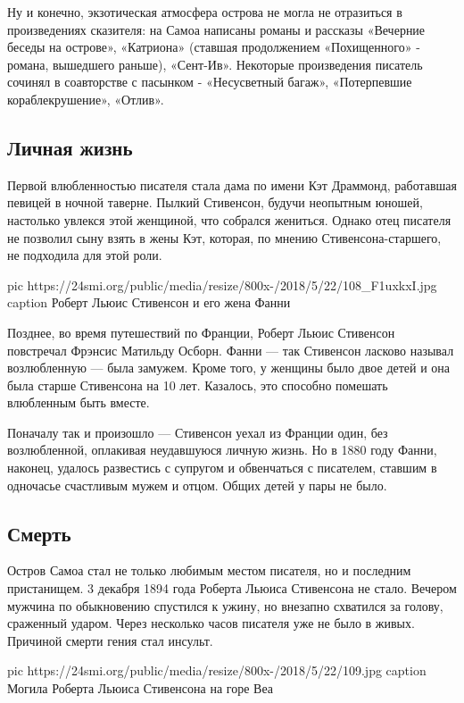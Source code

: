 Ну и конечно, экзотическая атмосфера острова не могла не отразиться в
произведениях сказителя: на Самоа написаны романы и рассказы «Вечерние
беседы на острове», «Катриона» (ставшая продолжением «Похищенного» -
романа, вышедшего раньше), «Сент-Ив». Некоторые произведения писатель
сочинял в соавторстве с пасынком - «Несусветный багаж», «Потерпевшие
кораблекрушение», «Отлив».

\subsection{Личная жизнь}

Первой влюбленностью писателя стала дама по имени Кэт Драммонд, работавшая
певицей в ночной таверне. Пылкий Стивенсон, будучи неопытным юношей,
настолько увлекся этой женщиной, что собрался жениться. Однако отец
писателя не позволил сыну взять в жены Кэт, которая, по мнению
Стивенсона-старшего, не подходила для этой роли.

\ifcmt
pic https://24smi.org/public/media/resize/800x-/2018/5/22/108_F1uxkxI.jpg
caption Роберт Льюис Стивенсон и его жена Фанни
\fi

Позднее, во время путешествий по Франции, Роберт Льюис Стивенсон
повстречал Фрэнсис Матильду Осборн. Фанни — так Стивенсон ласково называл
возлюбленную — была замужем. Кроме того, у женщины было двое детей и она
была старше Стивенсона на 10 лет. Казалось, это способно помешать
влюбленным быть вместе.

Поначалу так и произошло — Стивенсон уехал из Франции один, без
возлюбленной, оплакивая неудавшуюся личную жизнь. Но в 1880 году Фанни,
наконец, удалось развестись с супругом и обвенчаться с писателем, ставшим
в одночасье счастливым мужем и отцом. Общих детей у пары не было.

\subsection{Смерть}

Остров Самоа стал не только любимым местом писателя, но и последним
пристанищем. 3 декабря 1894 года Роберта Льюиса Стивенсона не стало.
Вечером мужчина по обыкновению спустился к ужину, но внезапно схватился за
голову, сраженный ударом. Через несколько часов писателя уже не было в
живых. Причиной смерти гения стал инсульт.

\ifcmt
pic https://24smi.org/public/media/resize/800x-/2018/5/22/109.jpg
caption Могила Роберта Льюиса Стивенсона на горе Веа
\fi

